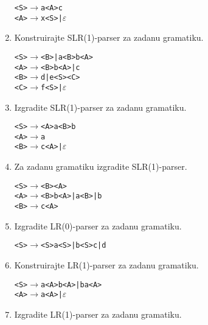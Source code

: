 \documentclass[times, 12pt, utf8]{book}
\begin{document}
\begin{enumerate}[resume]
\begin{alltt}
<S> \(\to\) a<A>c
<A> \(\to\) x<S> | \(\varepsilon\)
\end{alltt}

\item 
Konstruirajte SLR(1)-parser za zadanu gramatiku. \cite[str.~139-147]{udzbenik} \cite{auditorne}

\begin{alltt}
<S> \(\to\) <B> | a<B>b<A>
<A> \(\to\) <B>b<A> | c
<B> \(\to\) d | e<S><C>
<C> \(\to\) f<S> | \(\varepsilon\)
\end{alltt}

\item
Izgradite SLR(1)-parser za zadanu gramatiku. \cite[str.~139-147]{udzbenik} \cite{auditorne}

\begin{alltt}
<S> \(\to\) <A>a<B>b
<A> \(\to\) a
<B> \(\to\) c<A> | \(\varepsilon\)
\end{alltt}

\item
Za zadanu gramatiku izgradite SLR(1)-parser. \cite[str.~139-147]{udzbenik} \cite{auditorne}

\begin{alltt}
<S> \(\to\) <B><A>
<A> \(\to\) <B>b<A> | a<B> | b
<B> \(\to\) c<A>
\end{alltt} 

\item
Izgradite LR(0)-parser za zadanu gramatiku. \cite[str.~139-147]{udzbenik} \cite{auditorne}

\begin{alltt}
<S> \(\to\) <S>a<S> | b<S>c | d
\end{alltt}

\item
Konstruirajte LR(1)-parser za zadanu gramatiku. \cite[str.~147-152]{udzbenik} \cite{auditorne}

\begin{alltt}
<S> \(\to\) a<A>b<A> | ba<A>
<A> \(\to\) a<A> | \(\varepsilon\)
\end{alltt}

\item
Izgradite LR(1)-parser za zadanu gramatiku. \cite[str.~139-147]{udzbenik} \cite{auditorne}


\end{enumerate}
\end{document}
